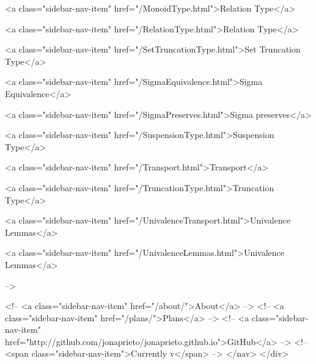       
    
      
        
          <a class="sidebar-nav-item" href="/MonoidType.html">Relation Type</a>
        
      
    
      
        
          <a class="sidebar-nav-item" href="/RelationType.html">Relation Type</a>
        
      
    
      
        
          <a class="sidebar-nav-item" href="/SetTruncationType.html">Set Truncation Type</a>
        
      
    
      
        
          <a class="sidebar-nav-item" href="/SigmaEquivalence.html">Sigma Equivalence</a>
        
      
    
      
        
          <a class="sidebar-nav-item" href="/SigmaPreserves.html">Sigma preserves</a>
        
      
    
      
        
          <a class="sidebar-nav-item" href="/SuspensionType.html">Suspension Type</a>
        
      
    
      
        
          <a class="sidebar-nav-item" href="/Transport.html">Transport</a>
        
      
    
      
        
          <a class="sidebar-nav-item" href="/TruncationType.html">Truncation Type</a>
        
      
    
      
        
          <a class="sidebar-nav-item" href="/UnivalenceTransport.html">Univalence Lemmas</a>
        
      
    
      
        
          <a class="sidebar-nav-item" href="/UnivalenceLemmas.html">Univalence Lemmas</a>
        
      
     -->

    <!-- <a class="sidebar-nav-item" href="/about/">About</a> -->
    <!-- <a class="sidebar-nav-item" href="/plans/">Plans</a> -->
    <!-- <a class="sidebar-nav-item" href="http://github.com/jonaprieto/jonaprieto.github.io">GitHub</a> -->
    <!-- <span class="sidebar-nav-item">Currently v</span> -->
  </nav>
</div>


